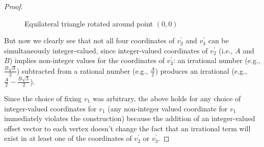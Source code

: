 \documentclass{article}
\begin{document}
\begin{proof}
\begin{figure}[H]
\begin{tikzpicture}
    \end{tikzpicture}
    \caption{Equilateral triangle rotated around point \((0,0)\)}
    \label{fig:fig2}
\end{figure}

But now we clearly see that not all four coordinates of $v^{\prime}_{2}$ and $v^{\prime}_{3}$ can be simultaneously integer-valued, since integer-valued coordinates of $v^{\prime}_{2}$ (i.e., $A$ and $B$) implies non-integer values for the coordinates of $v^{\prime}_{3}$: an irrational number (e.g., $\frac{B\sqrt{3}}{2}$) subtracted from a rational number (e.g., $\frac{A}{2}$) produces an irrational (e.g., $\frac{A}{2} - \frac{B\sqrt{3}}{2}$).

Since the choice of fixing $v_{1}$ was arbitrary, the above holds for any choice of integer-valued coordinates for $v_{1}$ (any non-integer valued coordinate for $v_{1}$ immediately violates the construction) because the addition of an integer-valued offset vector to each vertex doesn't change the fact that an irrational term will exist in at least one of the coordinates of $v^{\prime}_{2}$ or $v^{\prime}_{3}$.

\end{proof}
\end{document}

